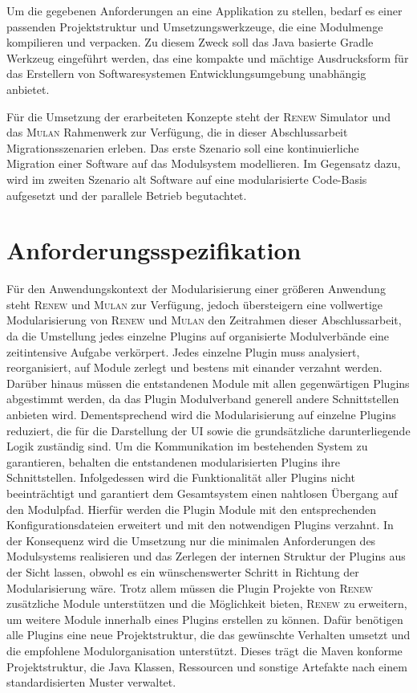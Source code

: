 	Um die gegebenen Anforderungen an eine Applikation zu stellen, bedarf es einer passenden Projektstruktur und Umsetzungswerkzeuge, die eine Modulmenge kompilieren und verpacken. Zu diesem Zweck soll das Java basierte Gradle Werkzeug eingeführt werden, das eine kompakte und mächtige Ausdrucksform für das Erstellern von Softwaresystemen Entwicklungsumgebung unabhängig anbietet. \bigbreak

	Für die Umsetzung der erarbeiteten Konzepte steht der \textsc{Renew} Simulator und das \textsc{Mulan} Rahmenwerk zur Verfügung, die in dieser Abschlussarbeit Migrationsszenarien erleben.\newline 
	Das erste Szenario soll eine kontinuierliche Migration einer Software auf das Modulsystem modellieren. Im Gegensatz dazu, wird im zweiten Szenario alt Software auf eine modularisierte Code-Basis aufgesetzt und der parallele Betrieb begutachtet.  

\section{Anforderungsspezifikation} 
	Für den Anwendungskontext der Modularisierung einer größeren Anwendung steht \textsc{Renew} und \textsc{Mulan} zur Verfügung, jedoch übersteigern eine vollwertige Modularisierung von \textsc{Renew} und \textsc{Mulan} den Zeitrahmen dieser Abschlussarbeit, da die Umstellung jedes einzelne Plugins auf organisierte Modulverbände eine zeitintensive Aufgabe verkörpert. Jedes einzelne Plugin muss analysiert, reorganisiert, auf Module zerlegt und bestens mit einander verzahnt werden. Darüber hinaus müssen die entstandenen Module mit allen gegenwärtigen Plugins abgestimmt werden, da das Plugin Modulverband generell andere Schnittstellen anbieten wird. \bigbreak
	Dementsprechend wird die Modularisierung auf einzelne Plugins reduziert, die für die Darstellung der UI sowie die grundsätzliche darunterliegende Logik zuständig sind. Um die Kommunikation im bestehenden System zu garantieren, behalten die entstandenen modularisierten Plugins ihre Schnittstellen. Infolgedessen wird die Funktionalität aller Plugins nicht beeinträchtigt und garantiert dem Gesamtsystem einen nahtlosen Übergang auf den Modulpfad. Hierfür werden die Plugin Module mit den entsprechenden Konfigurationsdateien erweitert und mit den notwendigen Plugins verzahnt. In der Konsequenz wird die Umsetzung nur die minimalen Anforderungen des Modulsystems realisieren und das Zerlegen der internen Struktur der Plugins aus der Sicht lassen, obwohl es ein wünschenswerter Schritt in Richtung der Modularisierung wäre. \newline 
	Trotz allem müssen die Plugin Projekte von \textsc{Renew} zusätzliche Module unterstützen und die Möglichkeit bieten, \textsc{Renew} zu erweitern, um weitere Module innerhalb eines Plugins erstellen zu können. Dafür benötigen alle Plugins eine neue Projektstruktur, die das gewünschte Verhalten umsetzt und die empfohlene Modulorganisation unterstützt. Dieses trägt die Maven konforme Projektstruktur, die Java Klassen, Ressourcen und sonstige Artefakte nach einem standardisierten Muster verwaltet.  \bigbreak

